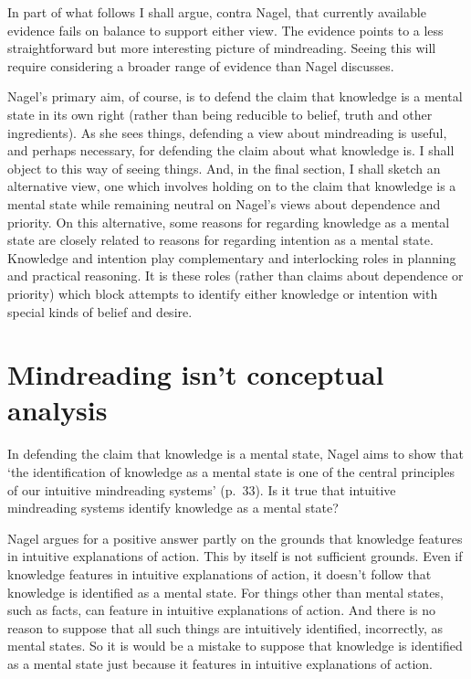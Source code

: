 \documentclass[12pt,\papersize]{extarticle}
\begin{document}
In part of what follows
I shall
argue, contra  Nagel, that
currently available evidence fails on balance to support either view.
The evidence points to a less straightforward but more interesting picture of  mindreading.
Seeing this will require considering a broader range of evidence than Nagel discusses.

Nagel's primary aim, of course,
is to defend the claim that
knowledge is a mental state in its own right
(rather than being reducible to belief, truth and other ingredients).
As she sees things,
defending a view about mindreading
is useful, and perhaps necessary,
for defending the claim about what knowledge is.
I shall object to this way of seeing things.
And, in the final section, I shall sketch an alternative view,
one which involves holding on to the claim that knowledge is a mental state
while remaining neutral on Nagel's views about dependence and priority.
On this alternative,
some reasons for regarding knowledge as a mental state are 
closely related to
reasons for regarding intention as a mental state.
Knowledge and intention 
play complementary and interlocking roles in planning and practical reasoning.
It is these roles 
(rather than claims about dependence or priority)
which block attempts to identify either knowledge or intention with special kinds of belief and desire.




\section{Mindreading isn't conceptual analysis}
In defending the claim that knowledge is a mental state, Nagel aims to show that `the identification of knowledge as a mental state is one of the central principles of our intuitive mindreading systems' (p.\ 33).
Is it true that intuitive mindreading systems identify knowledge as a mental state?

Nagel argues for a positive answer
partly on the grounds that 
knowledge features in intuitive explanations of action.
This by itself is not sufficient grounds.
Even if knowledge features in intuitive explanations of action, 
it doesn't follow that
knowledge is identified as a mental state.
For things other than mental states, such as facts, can feature in intuitive explanations of action.
And there is no reason to suppose that all such things are intuitively identified, incorrectly, as mental states.
So it is would be a mistake to suppose that knowledge is identified as a mental state just because it features in intuitive explanations of action.
\end{document}
